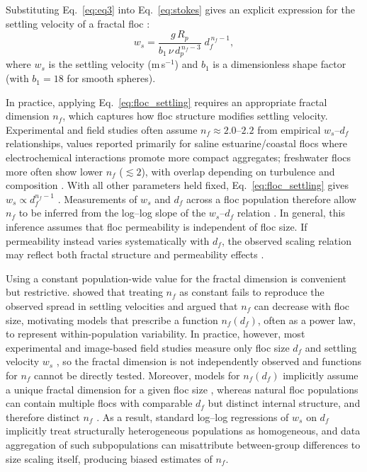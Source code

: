 \documentclass{agujournal2019}
\begin{document}
Substituting Eq.~\eqref{eq:eq3} into Eq.~\eqref{eq:stokes} gives an explicit expression for the settling velocity of a fractal floc \cite{strom2011explicit, winterwerp1998simple}:
\begin{equation}
    w_s = \frac{g\,R_p}{b_1\,\nu\,d_p^{\,n_f - 3}}\; d_f^{\,n_f - 1},
    \label{eq:floc_settling}
\end{equation}
where $w_s$ is the settling velocity (m\,s$^{-1}$) and $b_1$ is a dimensionless shape factor (with $b_1=18$ for smooth spheres).

In practice, applying Eq.~\eqref{eq:floc_settling} requires an appropriate fractal dimension $n_f$, which captures how floc structure modifies settling velocity. Experimental and field studies often assume $n_f \approx 2.0$--$2.2$ from empirical $w_s$--$d_f$ relationships, values reported primarily for saline estuarine/coastal flocs where electrochemical interactions promote more compact aggregates; freshwater flocs more often show lower $n_f$ ($\lesssim 2$), with overlap depending on turbulence and composition \cite{winterwerp1998simple,winterwerp2006heuristic}. With all other parameters held fixed, Eq.~\eqref{eq:floc_settling} gives $w_s \propto d_f^{n_f-1}$ \cite{johnson1996settling, li1989fractal}. Measurements of $w_s$ and $d_f$ across a floc population therefore allow $n_f$ to be inferred from the log--log slope of the $w_s$--$d_f$ relation \cite{kranenburg1994fractal, strom2011explicit, winterwerp1998simple, winterwerp2002flocculation, winterwerp2004introduction, winterwerp2006heuristic}. In general, this inference assumes that floc permeability is independent of floc size. If permeability instead varies systematically with $d_f$, the observed scaling relation may reflect both fractal structure and permeability effects \cite{strom2011explicit, nghiem2026flocculated}.

Using a constant population-wide value for the fractal dimension is convenient but restrictive.  showed that treating $n_f$ as constant fails to reproduce the observed spread in settling velocities and argued that $n_f$ can decrease with floc size, motivating models that prescribe a function $n_f(d_f)$, often as a power law, to represent within-population variability. In practice, however, most experimental and image-based field studies measure only floc size $d_f$ and settling velocity $w_s$ \cite{smith2015image, nghiem2024testing}, so the fractal dimension is not independently observed and functions for $n_f$ cannot be directly tested. Moreover, models for $n_f(d_f)$ implicitly assume a unique fractal dimension for a given floc size \cite{khelifa2006models}, whereas natural floc populations can contain multiple flocs with comparable $d_f$ but distinct internal structure, and therefore distinct $n_f$ \cite{maggi2007variable}. As a result, standard log--log regressions of $w_s$ on $d_f$ implicitly treat structurally heterogeneous populations as homogeneous, and data aggregation of such subpopulations can misattribute between-group differences to size scaling itself, producing biased estimates of $n_f$.
\end{document}

